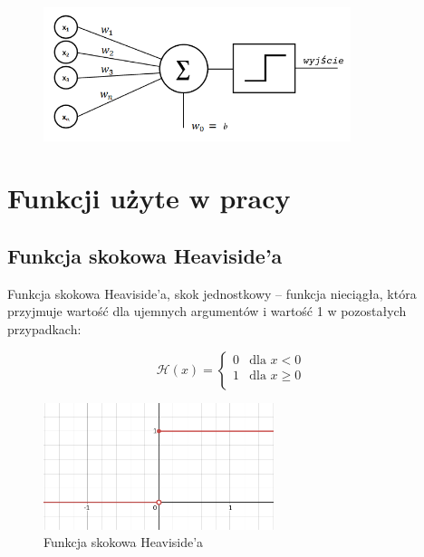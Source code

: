 \documentclass{article}
\begin{document}
\begin{figure}[H]
	\centering
	\includegraphics[width=0.8\textwidth,keepaspectratio=true]{neuron_rosenblatta}
\end{figure}

\section{Funkcji użyte w pracy}

\subsection{Funkcja skokowa Heaviside’a}
Funkcja skokowa Heaviside’a, skok jednostkowy – funkcja nieciągła, która przyjmuje wartość dla ujemnych argumentów i wartość 1 w pozostałych przypadkach:

\begin{equation}
	\mathcal{H}(x) = 
	\begin{cases}
		0 & \text{dla $x < 0$}\\
		1 & \text{dla $x \geqslant 0$ }\\
	\end{cases}    
\end{equation}

\begin{figure}[H]
	\centering
	\includegraphics[width=0.6\textwidth,keepaspectratio=true]{Heaviside}
	\caption{
		Funkcja skokowa Heaviside’a
	}
	\label{Heaviside}
\end{figure}
\end{document}
